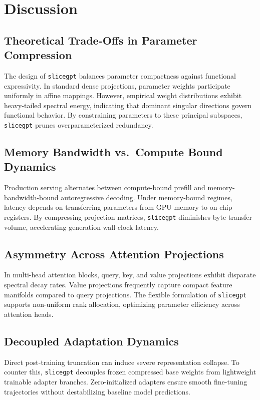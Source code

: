 \section{Discussion}

\subsection{Theoretical Trade-Offs in Parameter Compression}
The design of \texttt{slicegpt} balances parameter compactness against functional expressivity. In standard dense projections, parameter weights participate uniformly in affine mappings. However, empirical weight distributions exhibit heavy-tailed spectral energy, indicating that dominant singular directions govern functional behavior. By constraining parameters to these principal subspaces, \texttt{slicegpt} prunes overparameterized redundancy.

\subsection{Memory Bandwidth vs.\ Compute Bound Dynamics}
Production serving alternates between compute-bound prefill and memory-bandwidth-bound autoregressive decoding. Under memory-bound regimes, latency depends on transferring parameters from GPU memory to on-chip registers. By compressing projection matrices, \texttt{slicegpt} diminishes byte transfer volume, accelerating generation wall-clock latency.

\subsection{Asymmetry Across Attention Projections}
In multi-head attention blocks, query, key, and value projections exhibit disparate spectral decay rates. Value projections frequently capture compact feature manifolds compared to query projections. The flexible formulation of \texttt{slicegpt} supports non-uniform rank allocation, optimizing parameter efficiency across attention heads.

\subsection{Decoupled Adaptation Dynamics}
Direct post-training truncation can induce severe representation collapse. To counter this, \texttt{slicegpt} decouples frozen compressed base weights from lightweight trainable adapter branches. Zero-initialized adapters ensure smooth fine-tuning trajectories without destabilizing baseline model predictions.

